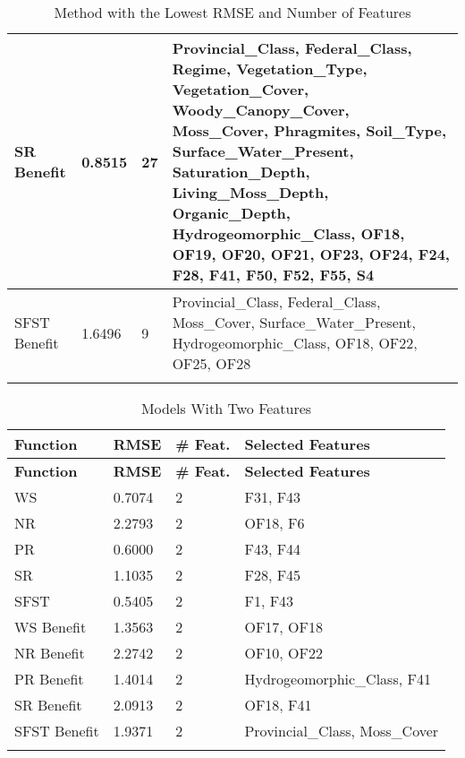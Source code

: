 \begin{longtable}{|p{3cm}|p{2cm}|p{2cm}|p{8cm}|}
SR Benefit & 0.8515 & 27 & Provincial\_Class, Federal\_Class, Regime, Vegetation\_Type, Vegetation\_Cover, Woody\_Canopy\_Cover, Moss\_Cover, Phragmites, Soil\_Type, Surface\_Water\_Present, Saturation\_Depth, Living\_Moss\_Depth, Organic\_Depth, Hydrogeomorphic\_Class, OF18, OF19, OF20, OF21, OF23, OF24, F24, F28, F41, F50, F52, F55, S4 \\ \hline
SFST Benefit & 1.6496 & 9 & Provincial\_Class, Federal\_Class, Moss\_Cover, Surface\_Water\_Present, Hydrogeomorphic\_Class, OF18, OF22, OF25, OF28 \\ \hline

\caption{Method with the Lowest RMSE and Number of Features}
\label{fig_reg_specxtra:lowest_rmse_feat}
\end{longtable}

\begin{longtable}{|p{3cm}|p{2cm}|p{2cm}|p{8cm}|}
\hline
\textbf{Function} & \textbf{RMSE} & \textbf{\# Feat.} & \textbf{Selected Features} \\ \hline
\endfirsthead
\hline
\textbf{Function} & \textbf{RMSE} & \textbf{\# Feat.} & \textbf{Selected Features} \\ \hline
\endhead

WS & 0.7074 & 2 & F31, F43 \\ \hline
NR & 2.2793 & 2 & OF18, F6 \\ \hline
PR & 0.6000 & 2 & F43, F44 \\ \hline
SR & 1.1035 & 2 & F28, F45 \\ \hline
SFST & 0.5405 & 2 & F1, F43 \\ \hline
WS Benefit & 1.3563 & 2 & OF17, OF18 \\ \hline
NR Benefit & 2.2742 & 2 & OF10, OF22 \\ \hline
PR Benefit & 1.4014 & 2 & Hydrogeomorphic\_Class, F41 \\ \hline
SR Benefit & 2.0913 & 2 & OF18, F41 \\ \hline
SFST Benefit & 1.9371 & 2 & Provincial\_Class, Moss\_Cover \\ \hline

\caption{Models With Two Features}
\label{fig_reg_specxtra:lowest_rmse_prop_feat}
\end{longtable}

